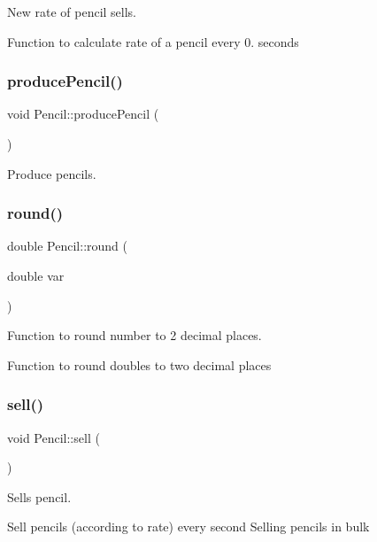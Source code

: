 New rate of pencil sells.

Function to calculate rate of a pencil every 0. seconds \mbox{\label{classPencil_ae966b635fd81f8d346aaa7f8f782f143}} 
\subsubsection{\texorpdfstring{produce\+Pencil()}{producePencil()}}
{\footnotesize\ttfamily void Pencil\+::produce\+Pencil (\begin{DoxyParamCaption}{ }\end{DoxyParamCaption})}

Produce pencils. \mbox{\label{classPencil_a9bbb66405447f4cc218ecbd1a09b7c3b}} 
\subsubsection{\texorpdfstring{round()}{round()}}
{\footnotesize\ttfamily double Pencil\+::round (\begin{DoxyParamCaption}\item[{double}]{var }\end{DoxyParamCaption})}

Function to round number to 2 decimal places.

Function to round doubles to two decimal places \mbox{\label{classPencil_a2731dadbd64edeee0a1cc773a79eee24}} 
\subsubsection{\texorpdfstring{sell()}{sell()}}
{\footnotesize\ttfamily void Pencil\+::sell (\begin{DoxyParamCaption}{ }\end{DoxyParamCaption})}

Sells pencil.

Sell pencils (according to rate) every second Selling pencils in bulk \mbox{\label{classPencil_aaeb664bbf0ab3796bc548eccee5924ed}} 
